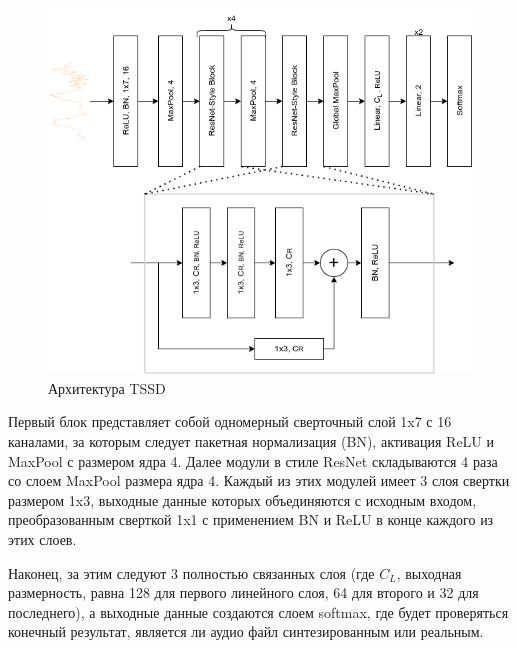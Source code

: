 \begin{figure}[H]
	\centering
	\includegraphics[width=0.7\linewidth]{images/TSSD.png}
	\caption{Архитектура TSSD}
	\label{fig:tssd}
\end{figure}

Первый блок представляет собой одномерный сверточный слой 1x7 с 16 каналами, за которым следует пакетная нормализация (BN), активация ReLU и MaxPool с размером ядра 4. Далее модули в стиле ResNet \cite{last-one} складываются 4 раза со слоем MaxPool размера ядра 4.
Каждый из этих модулей имеет 3 слоя свертки размером 1x3, выходные данные которых объединяются с исходным входом, преобразованным сверткой 1x1 с применением BN и ReLU в конце каждого из этих слоев.

Наконец, за этим следуют 3 полностью связанных слоя (где \(C_{L}\), выходная размерность, равна 128 для первого линейного слоя, 64 для второго и 32 для последнего), а выходные данные создаются слоем softmax, где будет проверяться конечный результат, является ли аудио файл синтезированным или реальным.




